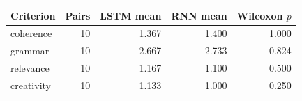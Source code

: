 \begin{tabular}{lrrrr}
\toprule
Criterion & Pairs & LSTM mean & RNN mean & Wilcoxon $p$ \\
\midrule
coherence & 10 & 1.367 & 1.400 & 1.000 \\
grammar & 10 & 2.667 & 2.733 & 0.824 \\
relevance & 10 & 1.167 & 1.100 & 0.500 \\
creativity & 10 & 1.133 & 1.000 & 0.250 \\
\bottomrule
\end{tabular}
